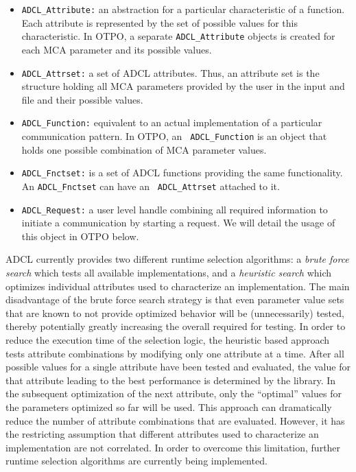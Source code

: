 \begin{itemize}
\item {\tt ADCL\_\-Attribute:} an abstraction for a particular
  characteristic of a function. Each attribute is represented by the
  set of possible values for this characteristic. In OTPO, a separate
  {\tt ADCL\_\-Attribute} objects is created for each MCA parameter
  and its possible values.
\item {\tt ADCL\_\-Attrset:} a set of ADCL attributes. Thus, an
  attribute set is the structure holding all MCA parameters provided
  by the user in the input and file and their possible values.
\item {\tt ADCL\_\-Function:} equivalent to an actual implementation
  of a particular communication pattern. In OTPO, an {\tt
    ADCL\_\-Function} is an object that holds one possible combination
  of MCA parameter values.
\item {\tt ADCL\_\-Fnctset:} is a set of ADCL functions providing the
  same functionality. An {\tt ADCL\_\-Fnctset} can have an {\tt
    ADCL\_\-Attrset} attached to it.
\item {\tt ADCL\_\-Request:} a user level handle combining all
  required information to initiate a communication by starting a
  request. We will detail the usage of this object in OTPO below.
\end{itemize}

ADCL currently provides two different runtime selection algorithms: a
{\it brute force search} which tests all available implementations,
and a {\it heuristic search} which optimizes individual attributes
used to characterize an implementation. The main disadvantage of the
brute force search strategy is that even parameter value sets that are
known to not provide optimized behavior will be (unnecessarily)
tested, thereby potentially greatly increasing the overall required
for testing. In order to reduce the execution time of the selection
logic, the heuristic based approach tests attribute combinations by
modifying only one attribute at a time. After all possible values for
a single attribute have been tested and evaluated, the value for that
attribute leading to the best performance is determined by the
library. In the subsequent optimization of the next attribute, only
the ``optimal'' values for the parameters optimized so far will be
used. This approach can dramatically reduce the number of attribute
combinations that are evaluated. However, it has the restricting
assumption that different attributes used to characterize an
implementation are not correlated. In order to overcome this
limitation, further runtime selection algorithms are currently being
implemented.

